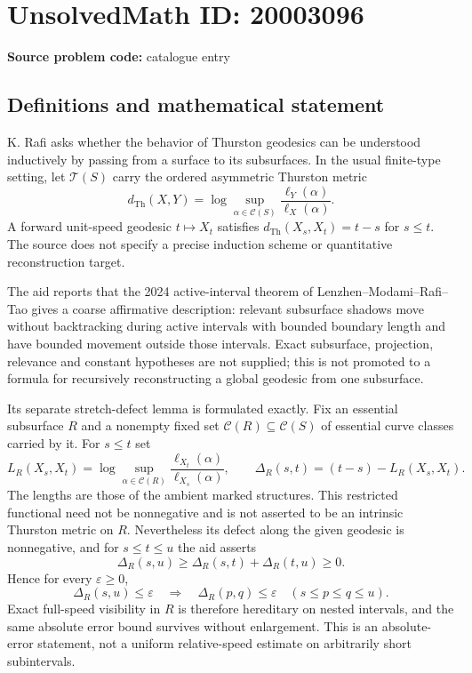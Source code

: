 \documentclass[11pt]{article}
\newcommand{\eps}{\varepsilon}
\begin{document}
\section*{UnsolvedMath ID: 20003096}
\textbf{Source problem code:} catalogue entry
\subsection{Definitions and mathematical statement}
K. Rafi asks whether the behavior of Thurston geodesics can be understood inductively by passing from a surface to its subsurfaces. In the usual finite-type setting, let $\mathcal T(S)$ carry the ordered asymmetric Thurston metric
\[
d_{\mathrm{Th}}(X,Y)=\log\sup_{\alpha\in\mathcal C(S)}\frac{\ell_Y(\alpha)}{\ell_X(\alpha)}.
\]
A forward unit-speed geodesic $t\mapsto X_t$ satisfies $d_{\mathrm{Th}}(X_s,X_t)=t-s$ for $s\leq t$. The source does not specify a precise induction scheme or quantitative reconstruction target.

The aid reports that the 2024 active-interval theorem of Lenzhen--Modami--Rafi--Tao gives a coarse affirmative description: relevant subsurface shadows move without backtracking during active intervals with bounded boundary length and have bounded movement outside those intervals. Exact subsurface, projection, relevance and constant hypotheses are not supplied; this is not promoted to a formula for recursively reconstructing a global geodesic from one subsurface.

Its separate stretch-defect lemma is formulated exactly. Fix an essential subsurface $R$ and a nonempty fixed set $\mathcal C(R)\subseteq\mathcal C(S)$ of essential curve classes carried by it. For $s\leq t$ set
\[
L_R(X_s,X_t)=\log\sup_{\alpha\in\mathcal C(R)}
\frac{\ell_{X_t}(\alpha)}{\ell_{X_s}(\alpha)},\qquad
\Delta_R(s,t)=(t-s)-L_R(X_s,X_t).
\]
The lengths are those of the ambient marked structures. This restricted functional need not be nonnegative and is not asserted to be an intrinsic Thurston metric on $R$. Nevertheless its defect along the given geodesic is nonnegative, and for $s\leq t\leq u$ the aid asserts
\[
\Delta_R(s,u)\geq\Delta_R(s,t)+\Delta_R(t,u)\geq0.
\]
Hence for every $\eps\geq0$,
\[
\Delta_R(s,u)\leq\eps\quad\Longrightarrow\quad
\Delta_R(p,q)\leq\eps
\quad(s\leq p\leq q\leq u).
\]
Exact full-speed visibility in $R$ is therefore hereditary on nested intervals, and the same absolute error bound survives without enlargement. This is an absolute-error statement, not a uniform relative-speed estimate on arbitrarily short subintervals.
\end{document}
